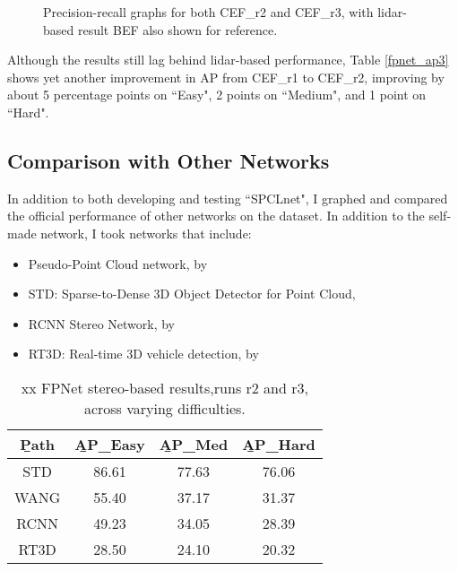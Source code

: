 \begin{figure}[H]
	\centering
	\caption{Precision-recall graphs for both CEF\_r2 and CEF\_r3, with lidar-based result BEF also shown for reference.}
	\label{fpnet_pr3}
\end{figure}

Although the results still lag behind lidar-based performance, Table \ref{fpnet_ap3} shows yet another improvement in AP from CEF\_r1 to CEF\_r2, improving by about 5 percentage points on ``Easy", 2 points on ``Medium", and 1 point on ``Hard".


\subsection{Comparison with Other Networks}
In addition to both developing and testing ``SPCLnet", I graphed and compared the official performance of other networks on the dataset. In addition to the self-made network, I took networks that include: 
\begin{itemize}
	\item Pseudo-Point Cloud network, by \cite{wang_pseudo-lidar_2019}
	\item STD: Sparse-to-Dense 3D Object Detector for Point Cloud, \cite{yang2019std}
	\item RCNN Stereo Network, by \cite{li_stereo_2019}
	\item RT3D: Real-time 3D vehicle detection, by \cite{zeng2018rt3d}
\end{itemize}

\begin{table}[ht]
	\centering
	\caption{xx FPNet stereo-based results,runs r2 and r3, across varying difficulties.}
	\begin{tabular}{|c|c|c|c|}
		\hline
		\b{Path} & \b{AP\_Easy} & \b{AP\_Med} & \b{AP\_Hard} \\ \hline
		  STD    &    86.61     &    77.63    &    76.06     \\ \hline
		  WANG   &    55.40     &    37.17    &    31.37     \\ \hline
		  RCNN   &    49.23     &    34.05    &    28.39     \\ \hline
		  RT3D   &    28.50     &    24.10    &    20.32     \\ \hline
	\end{tabular}
	\label{fpnet_ap4}
\end{table}

